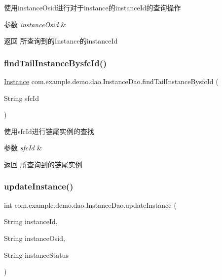 使用instance\+Osid进行对于instance的instance\+Id的查询操作 
\begin{DoxyParams}{参数}
{\em instance\+Osid} & \\
\hline
\end{DoxyParams}
\begin{DoxyReturn}{返回}
所查询到的\+Instance的instance\+Id 
\end{DoxyReturn}
\mbox{\label{interfacecom_1_1example_1_1demo_1_1dao_1_1_instance_dao_a5e63c119847d4bc9e17b81801cf3b5fc}} 
\subsubsection{\texorpdfstring{find\+Tail\+Instance\+Bysfc\+Id()}{findTailInstanceBysfcId()}}
{\footnotesize\ttfamily \mbox{\hyperlink{classcom_1_1example_1_1demo_1_1modular_1_1_instance}{Instance}} com.\+example.\+demo.\+dao.\+Instance\+Dao.\+find\+Tail\+Instance\+Bysfc\+Id (\begin{DoxyParamCaption}\item[{String}]{sfc\+Id }\end{DoxyParamCaption})}

使用sfc\+Id进行链尾实例的查找 
\begin{DoxyParams}{参数}
{\em sfc\+Id} & \\
\hline
\end{DoxyParams}
\begin{DoxyReturn}{返回}
所查询到的链尾实例 
\end{DoxyReturn}
\mbox{\label{interfacecom_1_1example_1_1demo_1_1dao_1_1_instance_dao_af656afb3a343904d20a1882a8058f202}} 
\subsubsection{\texorpdfstring{update\+Instance()}{updateInstance()}}
{\footnotesize\ttfamily int com.\+example.\+demo.\+dao.\+Instance\+Dao.\+update\+Instance (\begin{DoxyParamCaption}\item[{String}]{instance\+Id,  }\item[{String}]{instance\+Osid,  }\item[{String}]{instance\+Status }\end{DoxyParamCaption})}

